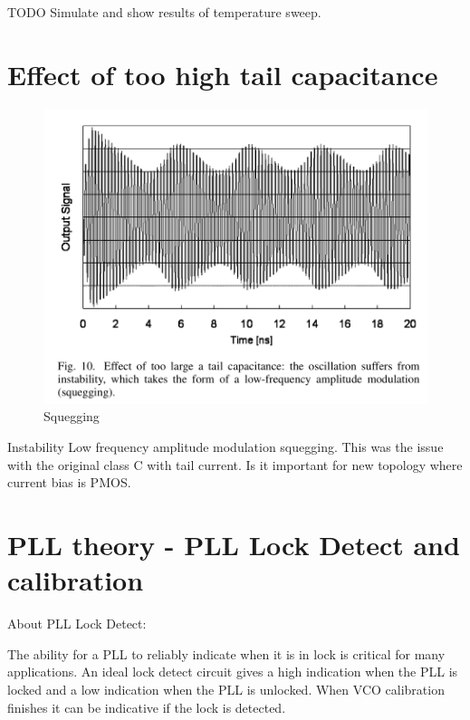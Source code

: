 \documentclass{article}
\begin{document}

TODO Simulate and show results of temperature sweep.


\section{Effect of too high tail capacitance}

\begin{figure}[!ht]
	\includegraphics[width=\linewidth]{Figures/squegging.png}
	\caption{Squegging}
	\label{fig:squegging}
\end{figure}

Instability Low frequency amplitude modulation squegging. This was the issue with the original class C with tail current. Is it important for new topology where current bias is PMOS.

\section{PLL theory - PLL Lock Detect and calibration}

About PLL Lock Detect:

\begin{info} %
	The ability for a PLL to reliably indicate when it is in lock is critical for many applications. An ideal lock detect circuit gives a high indication when the PLL is locked and a low indication when the PLL is unlocked. When VCO calibration finishes it can be indicative if the lock is detected. 
\end{info}
\end{document}

